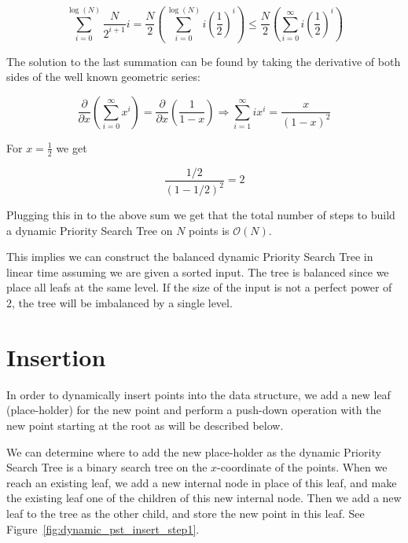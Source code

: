 \documentclass[twoside,11pt,openright]{report}
\begin{document}
$$\sum\limits_{i=0}^{\log(N)} \frac{N}{2^{i+1}}i = \frac{N}{2} \left( \sum\limits_{i=0}^{\log(N)} i\left(\frac{1}{2}\right)^i \right) \leq \frac{N}{2} \left( \sum\limits_{i=0}^{\infty} i\left(\frac{1}{2}\right)^i \right)$$

The solution to the last summation can be found by taking the derivative of both sides of the well known geometric series:

$$ \frac{\partial}{\partial x} \left( \sum\limits_{i=0}^{\infty} x^i \right) = \frac{\partial}{\partial x} \left( \frac{1}{1-x} \right) \Rightarrow \sum_{i=1}^{\infty} ix^i = \frac{x}{(1-x)^2} $$

For $x = \frac{1}{2}$ we get

$$\frac{1/2}{(1-1/2)^2} = 2$$

Plugging this in to the above sum we get that the total number of steps to build a dynamic Priority Search Tree on $N$ points is $\mathcal{O}(N)$.

This implies we can construct the balanced dynamic Priority Search Tree in linear time assuming we are given a sorted input. The tree is balanced since we place all leafs at the same level. If the size of the input is not a perfect power of 2, the tree will be imbalanced by a single level.

\section{Insertion}
In order to dynamically insert points into the data structure, we add a new leaf (place-holder) for the new point and perform a push-down operation with the new point starting at the root as will be described below.

We can determine where to add the new place-holder as the dynamic Priority Search Tree is a binary search tree on the $x$-coordinate of the points. When we reach an existing leaf, we add a new internal node in place of this leaf, and make the existing leaf one of the children of this new internal node. Then we add a new leaf to the tree as the other child, and store the new point in this leaf. See Figure~\ref{fig:dynamic_pst_insert_step1}.
\end{document}
